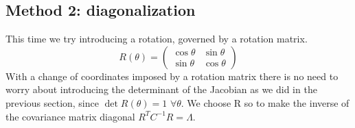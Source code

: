 \documentclass[a4paper,11pt,fleqn]{article}
\begin{document}
\subsection{Method 2: diagonalization}

This time we try introducing a rotation, governed by a rotation matrix.
\begin{equation}
    R(\theta) = 
    \begin{pmatrix}
        \cos{\theta} & \sin{\theta} \\
        \sin{\theta} & \cos{\theta} 
    \end{pmatrix}
\end{equation}
With a change of coordinates imposed by a rotation matrix there is no need
to worry about introducing the determinant of the Jacobian as we did in the
previous section, since $\det{R(\theta)}=1$ $\forall \theta$.
We choose R so to make the inverse of the covariance matrix diagonal $R^T C^{-1} R = \Lambda$.
\end{document}
